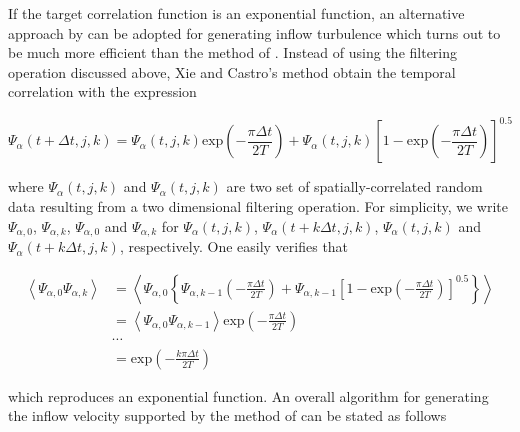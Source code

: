 If the target correlation function is an exponential function, an alternative approach by \cite{xie2008} can be adopted for generating inflow turbulence which turns out to be much more efficient than the method of \cite{klein2003}. Instead of using the filtering operation discussed above, Xie and Castro's method obtain the temporal correlation with the expression

\begin{equation} \label{temporalCorrelation}
\Psi_{\alpha}(t+\varDelta t,j,k) = \Psi_{\alpha}(t,j,k)\mathrm{exp}\left(-\frac{\pi \varDelta t}{2T} \right)+\varPsi_{\alpha}(t,j,k)\left[1-\mathrm{exp}\left(-\frac{\pi \varDelta t}{2T} \right)\right]^{0.5}
\end{equation}

\noindent where $\Psi_{\alpha}(t,j,k)$ and $\varPsi_{\alpha}(t,j,k)$ are two set of spatially-correlated random data resulting from a two dimensional filtering operation. For simplicity, we write $\Psi_{\alpha,0}$, $\Psi_{\alpha,k}$, $\varPsi_{\alpha,0}$ and $\varPsi_{\alpha,k}$ for $\Psi_{\alpha}(t,j,k)$, $\Psi_{\alpha}(t+k\varDelta t,j,k)$, $\varPsi_{\alpha}(t,j,k)$ and $\varPsi_{\alpha}(t+k\varDelta t,j,k)$, respectively. One easily verifies that

\begin{equation}
\begin{split}
\left\langle \Psi_{\alpha,0}\Psi_{\alpha,k} \right\rangle &= \left\langle \Psi_{\alpha,0}\left\{\Psi_{\alpha,k-1}\left(-\frac{\pi \varDelta t}{2T} \right)+ \varPsi_{\alpha,k-1}\left[1-\mathrm{exp}\left(-\frac{\pi \varDelta t}{2T} \right)\right]^{0.5}\right\}\right\rangle \\
& = \left\langle \Psi_{\alpha,0} \Psi_{\alpha,k-1} \right\rangle \mathrm{exp}\left(-\frac{\pi \varDelta t}{2T}\right) \\
& \cdots \\
& = \mathrm{exp}\left(-\frac{k\pi \varDelta t}{2T}\right)
\end{split}
\end{equation}

\noindent which reproduces an exponential function. An overall algorithm for generating the inflow velocity supported by the method of \cite{xie2008} can be stated as follows

